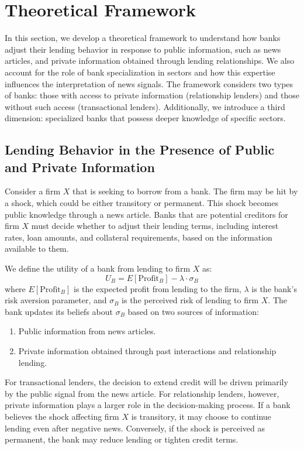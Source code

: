 \section{Theoretical Framework}
\label{sec:theoretical}

In this section, we develop a theoretical framework to understand how banks adjust their lending behavior in response to public information, such as news articles, and private information obtained through lending relationships. We also account for the role of bank specialization in sectors and how this expertise influences the interpretation of news signals. The framework considers two types of banks: those with access to private information (relationship lenders) and those without such access (transactional lenders). Additionally, we introduce a third dimension: specialized banks that possess deeper knowledge of specific sectors.

\subsection{Lending Behavior in the Presence of Public and Private Information}

Consider a firm $X$ that is seeking to borrow from a bank. The firm may be hit by a shock, which could be either transitory or permanent. This shock becomes public knowledge through a news article. Banks that are potential creditors for firm $X$ must decide whether to adjust their lending terms, including interest rates, loan amounts, and collateral requirements, based on the information available to them.

We define the utility of a bank from lending to firm $X$ as:
\[
U_B = E[\text{Profit}_B] - \lambda \cdot \sigma_B
\]
where $E[\text{Profit}_B]$ is the expected profit from lending to the firm, $\lambda$ is the bank's risk aversion parameter, and $\sigma_B$ is the perceived risk of lending to firm $X$. The bank updates its beliefs about $\sigma_B$ based on two sources of information: 
\begin{enumerate}
    \item Public information from news articles.
    \item Private information obtained through past interactions and relationship lending.
\end{enumerate}

For transactional lenders, the decision to extend credit will be driven primarily by the public signal from the news article. For relationship lenders, however, private information plays a larger role in the decision-making process. If a bank believes the shock affecting firm $X$ is transitory, it may choose to continue lending even after negative news. Conversely, if the shock is perceived as permanent, the bank may reduce lending or tighten credit terms.

